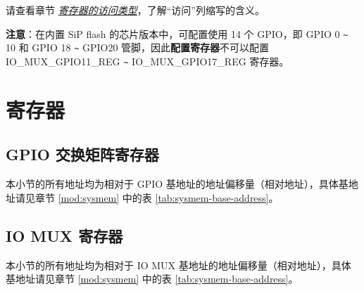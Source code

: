 \documentclass[main\_\_CN.tex]{subfiles}
\begin{document}
请查看章节 \hyperref[glossary-access-types]{\textit{寄存器的访问类型}}，了解“访问”列缩写的含义。

\textbf{注意}：在内置 SiP flash 的芯片版本中，可配置使用 14 个 GPIO，即 GPIO 0 \verb+~+ 10 和 GPIO 18 \verb+~+ GPIO20 管脚，因此\textbf{配置寄存器}不可以配置 IO\_MUX\_GPIO11\_REG \verb+~+ IO\_MUX\_GPIO17\_REG 寄存器。





\section{寄存器}

\subsection{GPIO 交换矩阵寄存器}
本小节的所有地址均为相对于 GPIO 基地址的地址偏移量（相对地址），具体基地址请见章节 \ref{mod:sysmem} \textit{} 中的表 \ref{tab:sysmem-base-address}。


\subsection{IO MUX 寄存器}
本小节的所有地址均为相对于 IO MUX 基地址的地址偏移量（相对地址），具体基地址请见章节 \ref{mod:sysmem} \textit{} 中的表 \ref{tab:sysmem-base-address}。

\end{document}
